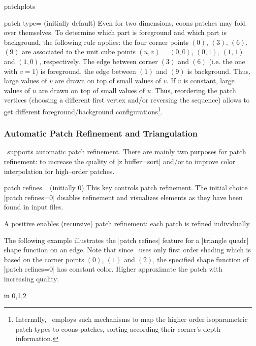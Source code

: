 \begin{pgfplotslibrary}{patchplots}
\begin{pgfplotskey}{patch type= (initially default)}
	Even for two dimensions, coons patches may fold over themselves. To determine which part is foreground and which part is background, the following rule applies: the four corner points $(0)$, $(3)$, $(6)$, $(9)$ are associated to the unit cube points $(u,v) = (0,0)$, $(0,1)$, $(1,1)$ and $(1,0)$, respectively. The edge between corner $(3)$ and $(6)$ (i.e. the one with $v=1$) is foreground, the edge between $(1)$ and $(9)$ is background. Thus, large values of $v$ are drawn on top of small values of $v$. If $v$ is constant, large values of $u$ are drawn on top of small values of $u$. Thus, reordering the patch vertices (choosing a different first vertex and/or reversing the sequence) allows to get different foreground/background configurations\footnote{Internally, \PGFPlots\ employs such mechanisms to map the higher order isoparametric patch types to coons patches, sorting according their corner's depth information.}.
	
\end{pgfplotskey}



\subsubsection{Automatic Patch Refinement and Triangulation}
\PGFPlots\ supports automatic patch refinement. There are mainly two purposes for patch refinement: to increase the quality of |z buffer=sort| and/or to improve color interpolation for high--order patches. 

\begin{pgfplotskey}{patch refines= (initially 0)}
	This key controls patch refinement. The initial choice |patch refines=0| disables refinement and visualizes elements as they have been found in input files.

	A positive  enables (recursive) patch refinement: each patch is refined individually. 

	The following example illustrates the |patch refines| feature for a |triangle quadr| shape function on an edge. Note that since \PGFPlots\ uses only first order shading which is based on the corner points $(0)$, $(1)$ and $(2)$, the specified shape function of |patch refines=0| has constant color. Higher  approximate the patch with increasing quality:
\begin{codeexample}[]
\foreach \level in {0,1,2} {%
	\begin{tikzpicture}
	\begin{axis}[
		nodes near coords={(\coordindex)},
		footnotesize,
		title={patch refines=\level}]


\end{axis}
\end{tikzpicture}}
\end{codeexample}
\end{pgfplotskey}
\end{pgfplotslibrary}
